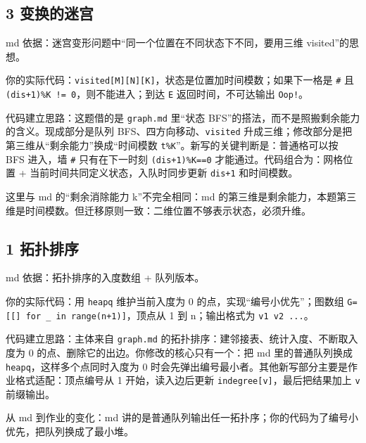 \documentclass[10pt,a4paper,fontset=none]{ctexart}
\begin{document}
\subsection{3 变换的迷宫}
\begin{sourcebox}
md 依据：迷宫变形问题中“同一个位置在不同状态下不同，要用三维 visited”的思想。
\end{sourcebox}
\begin{methodbox}
你的实际代码：\texttt{visited[M][N][K]}，状态是位置加时间模数；如果下一格是 \texttt{\#} 且 \texttt{(dis+1)\%K != 0}，则不能进入；到达 \texttt{E} 返回时间，不可达输出 \texttt{Oop!}。

代码建立思路：这题借的是 \texttt{graph.md} 里“状态 BFS”的搭法，而不是照搬剩余能力的含义。现成部分是队列 BFS、四方向移动、\texttt{visited} 升成三维；修改部分是把第三维从“剩余能力”换成“时间模数 \texttt{t\%K}”。新写的关键判断是：普通格可以按 BFS 进入，墙 \texttt{\#} 只有在下一时刻 \texttt{(dis+1)\%K==0} 才能通过。代码组合为：网格位置 + 当前时间共同定义状态，入队时同步更新 \texttt{dis+1} 和时间模数。
\end{methodbox}
这里与 md 的“剩余消除能力 k”不完全相同：md 的第三维是剩余能力，本题第三维是时间模数。但迁移原则一致：二维位置不够表示状态，必须升维。

\subsection{1 拓扑排序}
\begin{sourcebox}
md 依据：拓扑排序的入度数组 + 队列版本。
\end{sourcebox}
\begin{methodbox}
你的实际代码：用 \texttt{heapq} 维护当前入度为 0 的点，实现“编号小优先”；图数组 \texttt{G=[[] for \_ in range(n+1)]}，顶点从 1 到 n；输出格式为 \texttt{v1 v2 ...}。

代码建立思路：主体来自 \texttt{graph.md} 的拓扑排序：建邻接表、统计入度、不断取入度为 0 的点、删除它的出边。你修改的核心只有一个：把 md 里的普通队列换成 \texttt{heapq}，这样多个点同时入度为 0 时会先弹出编号最小者。其他新写部分主要是作业格式适配：顶点编号从 1 开始，读入边后更新 \texttt{indegree[v]}，最后把结果加上 \texttt{v} 前缀输出。
\end{methodbox}
从 md 到作业的变化：md 讲的是普通队列输出任一拓扑序；你的代码为了编号小优先，把队列换成了最小堆。
\end{document}
